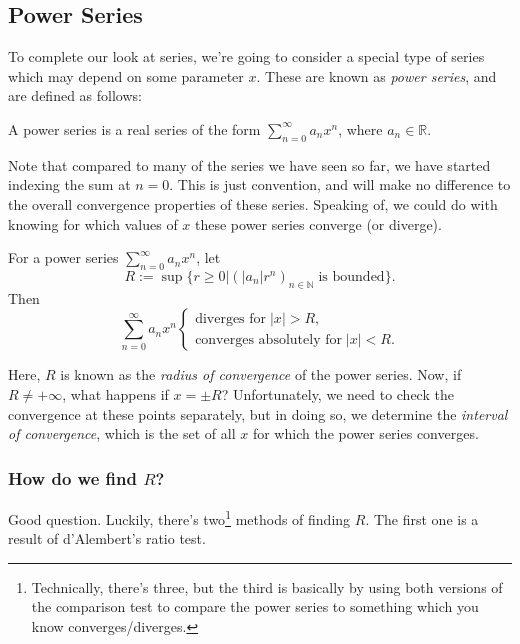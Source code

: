 \documentclass[
  10pt,
  a4paper]{article}
\theoremstyle{plain}
\theoremstyle{plain}
\theoremstyle{plain}
\theoremstyle{plain}
\theoremstyle{plain}
\theoremstyle{definition}
\theoremstyle{definition}
\theoremstyle{definition}
\theoremstyle{remark}
\let\BeginKnitrBlock\begin \let\EndKnitrBlock\end
\begin{document}
\hypertarget{power-series}{%
\subsection{Power Series}\label{power-series}}

To complete our look at series, we're going to consider a special type of series which may depend on some parameter \(x\). These are known as \emph{power series}, and are defined as follows:

\BeginKnitrBlock{definition}[Power Series]
{\label{def:def1} }A power series is a real series of the form \(\sum_{n = 0}^{\infty} a_n x^n\), where \(a_n \in \mathbb{R}\).
\EndKnitrBlock{definition}
Note that compared to many of the series we have seen so far, we have started indexing the sum at \(n = 0\). This is just convention, and will make no difference to the overall convergence properties of these series. Speaking of, we could do with knowing for which values of \(x\) these power series converge (or diverge).

\BeginKnitrBlock{proposition}
{\label{prp:prop1} }For a power series \(\sum_{n = 0}^{\infty} a_n x^n\), let \[R:= \sup\lbrace r \geq 0 \lvert \left(\lvert a_n \rvert r^n\right)_{n \in \mathbb{N}} \; \text{is bounded}\rbrace.\] Then \[\sum_{n = 0}^{\infty} a_n x^n \begin{cases}
\text{diverges for}\;\lvert x \rvert > R,\\
\text{converges absolutely for}\; \lvert x \rvert < R. 
\end{cases}\]
\EndKnitrBlock{proposition}
Here, \(R\) is known as the \emph{radius of convergence} of the power series. Now, if \(R \neq +\infty\), what happens if \(x = \pm R\)? Unfortunately, we need to check the convergence at these points separately, but in doing so, we determine the \emph{interval of convergence}, which is the set of all \(x\) for which the power series converges.

\hypertarget{how-do-we-find-r}{%
\subsubsection{\texorpdfstring{How do we find \(R\)?}{How do we find R?}}\label{how-do-we-find-r}}

Good question. Luckily, there's two\footnote{Technically, there's three, but the third is basically by using both versions of the comparison test to compare the power series to something which you know converges/diverges.} methods of finding \(R\). The first one is a result of d'Alembert's ratio test.
\end{document}

